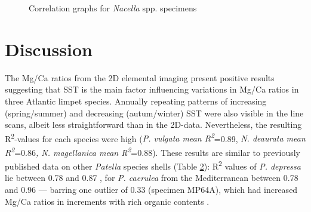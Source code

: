 \documentclass[
  authoryear,
  preprint,
  3p]{elsarticle}
\begin{document}
\begin{figure}


\caption{\label{fig-Nac_Corr}Correlation graphs for \emph{Nacella} spp.
specimens}

\end{figure}%

\section{Discussion}\label{Discussion}

The Mg/Ca ratios from the 2D elemental imaging present positive results
suggesting that SST is the main factor influencing variations in Mg/Ca
ratios in three Atlantic limpet species. Annually repeating patterns of
increasing (spring/summer) and decreasing (autum/winter) SST were also
visible in the line scans, albeit less straightforward than in the
2D-data. Nevertheless, the resulting R\textsuperscript{2}-values for
each species were high (\emph{P. vulgata mean
R\textsuperscript{2}}=0.89, \emph{N. deaurata mean
R\textsuperscript{2}}=0.86\emph{, N. magellanica mean
R\textsuperscript{2}}=0.88). These results are similar to previously
published data on other \emph{Patella} species shells (Table
\hyperref[Table_2]{2}): R\textsuperscript{2} values of \emph{P.
depressa} lie between 0.78 and 0.87 \citep{Garcia-Escarzaga2021-ij}, for
\emph{P. caerulea} from the Mediterranean between 0.78 and 0.96 ---
barring one outlier of 0.33 (specimen MP64A), which had increased Mg/Ca
ratios in increments with rich organic contents \citep{Hausmann2019-fi}.

\label{Table_2}
\fontsize{8pt}{8pt}\selectfont
\end{document}
